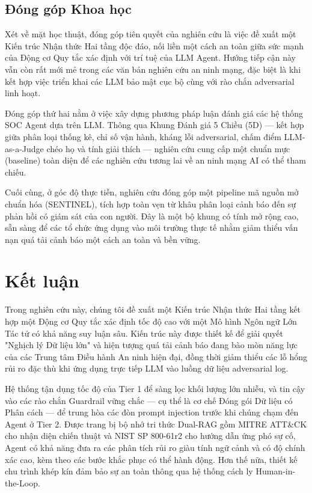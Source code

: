 \documentclass[12pt,a4paper]{article}
\begin{document}
\subsection{Đóng góp Khoa học}
Xét về mặt học thuật, đóng góp tiên quyết của nghiên cứu là việc đề xuất một Kiến trúc Nhận thức Hai tầng độc đáo, nối liền một cách an toàn giữa sức mạnh của Động cơ Quy tắc xác định với trí tuệ của LLM Agent. Hướng tiếp cận này vẫn còn rất mới mẻ trong các văn bản nghiên cứu an ninh mạng, đặc biệt là khi kết hợp việc triển khai các LLM bảo mật cục bộ cùng với rào chắn adversarial linh hoạt.

Đóng góp thứ hai nằm ở việc xây dựng phương pháp luận đánh giá các hệ thống SOC Agent dựa trên LLM. Thông qua Khung Đánh giá 5 Chiều (5D) — kết hợp giữa phân loại thống kê, chỉ số vận hành, kháng lỗi adversarial, chấm điểm LLM-as-a-Judge chéo họ và tính giải thích — nghiên cứu cung cấp một chuẩn mực (baseline) toàn diện để các nghiên cứu tương lai về an ninh mạng AI có thể tham chiếu.

Cuối cùng, ở góc độ thực tiễn, nghiên cứu đóng góp một pipeline mã nguồn mở chuẩn hóa (SENTINEL), tích hợp toàn vẹn từ khâu phân loại cảnh báo đến sự phản hồi có giám sát của con người. Đây là một bộ khung có tính mở rộng cao, sẵn sàng để các tổ chức ứng dụng vào môi trường thực tế nhằm giảm thiểu vấn nạn quá tải cảnh báo một cách an toàn và bền vững.

\newpage
\section{Kết luận}
Trong nghiên cứu này, chúng tôi đề xuất một Kiến trúc Nhận thức Hai tầng kết hợp một Động cơ Quy tắc xác định tốc độ cao với một Mô hình Ngôn ngữ Lớn Tác tử có khả năng suy luận sâu. Kiến trúc này được thiết kế để giải quyết "Nghịch lý Dữ liệu lớn" và hiện tượng quá tải cảnh báo đang bào mòn năng lực của các Trung tâm Điều hành An ninh hiện đại, đồng thời giảm thiểu các lỗ hổng rủi ro đặc thù khi ứng dụng trực tiếp LLM vào luồng dữ liệu adversarial log.

Hệ thống tận dụng tốc độ của Tier 1 để sàng lọc khối lượng lớn nhiễu, và tin cậy vào các rào chắn Guardrail vững chắc — cụ thể là cơ chế Đóng gói Dữ liệu có Phân cách — để trung hòa các đòn prompt injection trước khi chúng chạm đến Agent ở Tier 2. Được trang bị bộ nhớ tri thức Dual-RAG gồm MITRE ATT\&CK cho nhận diện chiến thuật và NIST SP 800-61r2 cho hướng dẫn ứng phó sự cố, Agent có khả năng đưa ra các phân tích rủi ro giàu tính ngữ cảnh và có độ chính xác cao, kèm theo các bước khắc phục có thể hành động. Hơn thế nữa, thiết kế chu trình khép kín đảm bảo sự an toàn thông qua hệ thống cách ly Human-in-the-Loop.
\end{document}
